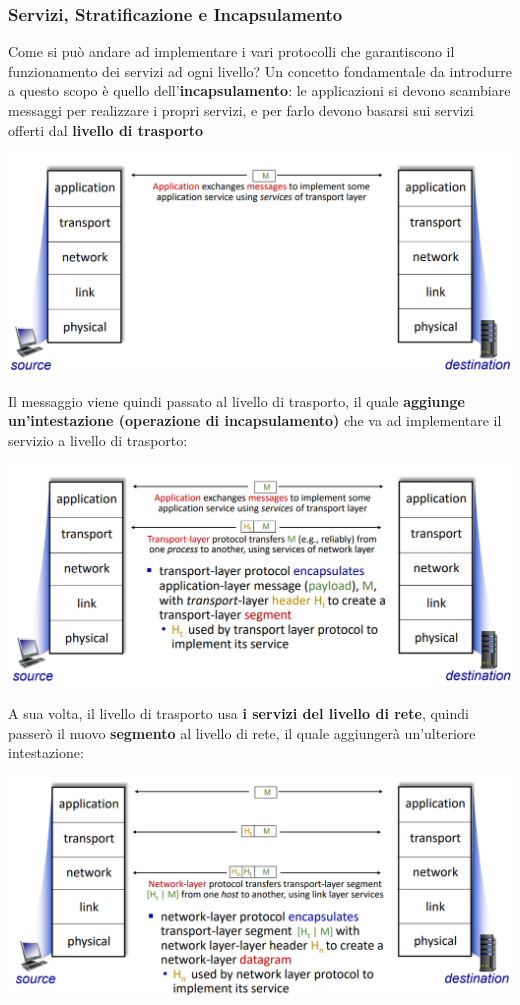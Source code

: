 \documentclass[12pt]{article}
\begin{document}
\subsubsection{Servizi, Stratificazione e Incapsulamento}
Come si può andare ad implementare i vari protocolli che garantiscono il funzionamento dei servizi ad ogni livello?
Un concetto fondamentale da introdurre a questo scopo è quello dell'\textbf{incapsulamento}: le applicazioni si devono
scambiare messaggi per realizzare i propri servizi, e per farlo devono basarsi sui servizi offerti dal \textbf{livello di trasporto}
\begin{center}
    \includegraphics[width =1\linewidth]{Images/25.PNG}
\end{center}
Il messaggio viene quindi passato al livello di trasporto, il quale \textbf{aggiunge un'intestazione (operazione di incapsulamento)} che va ad implementare il servizio a livello di trasporto:
\begin{center}
    \includegraphics[width =1\linewidth]{Images/26.PNG}
\end{center}
A sua volta, il livello di trasporto usa \textbf{i servizi del livello di rete}, quindi passerò il nuovo \textbf{segmento} al livello di rete, il quale aggiungerà un'ulteriore intestazione:
\begin{center}
    \includegraphics[width =1\linewidth]{Images/27.PNG}
\end{center}
\end{document}
